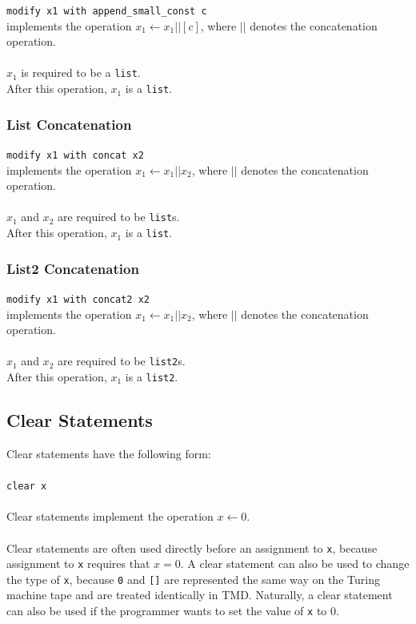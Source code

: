\documentclass{report}
\begin{document}
\texttt{modify x1 with append\_small\_const c} \\
implements the operation $x_1 \leftarrow x_1 || [c]$, where $||$ denotes the concatenation operation. \\ \\
$x_1$ is required to be a \texttt{list}. \\
After this operation, $x_1$ is a \texttt{list}.

\subsubsection{List Concatenation}

\texttt{modify x1 with concat x2} \\
implements the operation $x_1 \leftarrow x_1 || x_2$, where $||$ denotes the concatenation operation. \\ \\
$x_1$ and $x_2$ are required to be \texttt{list}s. \\
After this operation, $x_1$ is a \texttt{list}.

\subsubsection{List2 Concatenation}

\texttt{modify x1 with concat2 x2} \\
implements the operation $x_1 \leftarrow x_1 || x_2$, where $||$ denotes the concatenation operation. \\ \\
$x_1$ and $x_2$ are required to be \texttt{list2}s. \\
After this operation, $x_1$ is a \texttt{list2}.

\subsection{Clear Statements}

Clear statements have the following form: \\ \\
\texttt{clear x} \\ \\ 
Clear statements implement the operation $x \leftarrow 0$. \\ \\
Clear statements are often used directly before an assignment to \texttt{x}, because assignment to \texttt{x} requires that $x = 0$. A clear statement can also be used to change the type of \texttt{x}, because \texttt{0} and \texttt{[]} are represented the same way on the Turing machine tape and are treated identically in TMD. Naturally, a clear statement can also be used if the programmer wants to set the value of \texttt{x} to 0. \\
\end{document}
